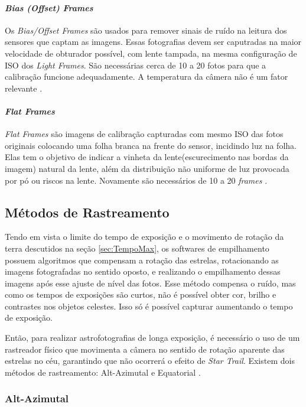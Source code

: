 \paragraph{\textit{Bias (Offset) Frames}}

Os \textit{Bias/Offset Frames} são usados para remover sinais de ruído na leitura dos sensores que captam as imagens. Essas fotografias devem ser caputradas na maior velocidade de obturador possível, com lente tampada, na mesma configuração de ISO dos \textit{Light Frames}. São necessárias cerca de 10 a 20 fotos para que a calibração funcione adequadamente. A temperatura da câmera não é um fator relevante \cite{man:deepskystackerfaq}.


\paragraph{\textit{Flat Frames}}
\textit{Flat Frames} são imagens de calibração capturadas com mesmo ISO das fotos originais colocando uma folha branca na frente do sensor, incidindo luz na folha. Elas tem o objetivo de indicar a vinheta da lente(escurecimento nas bordas da imagem) natural da lente, além da distribuição não uniforme de luz provocada por pó ou riscos na lente. Novamente são necessários de 10 a 20 \textit{frames}
\cite{man:deepskystackerfaq}.


\subsection{Métodos de Rastreamento}

Tendo em vista o limite do tempo de exposição e o movimento de rotação da terra descutidos na seção \ref{sec:TempoMax}, os softwares de empilhamento possuem algoritmos que compensam a rotação das estrelas, rotacionando as imagens fotografadas no sentido oposto, e realizando o empilhamento dessas imagens após esse ajuste de nível das fotos. Esse método compensa o ruído, mas como os tempos de exposições são curtos, não é possível obter cor, brilho e contrastes nos objetos celestes. Isso só é possível capturar aumentando o tempo de exposição. 

Então, para realizar astrofotografias de longa exposição, é necessário o uso de um rastreador físico que movimenta a câmera no sentido de rotação aparente das estrelas no céu, garantindo que não ocorrerá o efeito de \textit{Star Trail}. Existem dois métodos de rastreamento: Alt-Azimutal e Equatorial \cite{book:bbcsky}.

\subsubsection{Alt-Azimutal}

